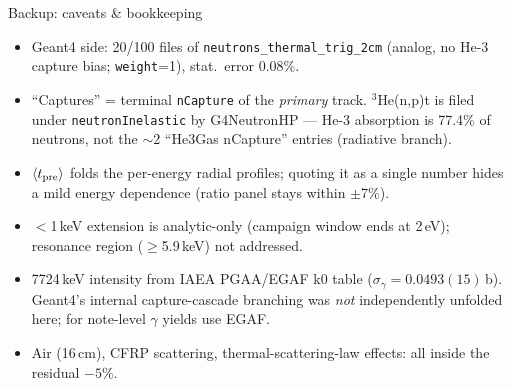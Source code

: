 \documentclass[aspectratio=169,11pt]{beamer}
\begin{document}
\begin{frame}{Backup: caveats \& bookkeeping}
  \small
  \begin{itemize}
    \item Geant4 side: 20/100 files of \texttt{neutrons\_thermal\_trig\_2cm}
          (analog, no He-3 capture bias; \texttt{weight}=1), stat.\ error 0.08\%.
    \item ``Captures'' = terminal \texttt{nCapture} of the \emph{primary}
          track. $^{3}$He(n,p)t is filed under \texttt{neutronInelastic} by
          G4NeutronHP --- He-3 absorption is 77.4\% of neutrons, not the
          $\sim$2 ``He3Gas nCapture'' entries (radiative branch).
    \item $\langle t_{\rm pre}\rangle$ folds the per-energy radial profiles;
          quoting it as a single number hides a mild energy dependence
          (ratio panel stays within $\pm$7\%).
    \item $<$1\,keV extension is analytic-only (campaign window ends at
          2\,eV); resonance region ($\geq$5.9\,keV) not addressed.
    \item 7724\,keV intensity from IAEA PGAA/EGAF k0 table
          ($\sigma_\gamma=0.0493(15)$\,b). Geant4's internal capture-cascade
          branching was \emph{not} independently unfolded here; for note-level
          $\gamma$ yields use EGAF.
    \item Air (16\,cm), CFRP scattering, thermal-scattering-law effects: all
          inside the residual $-5\%$.
  \end{itemize}
\end{frame}
\end{document}

